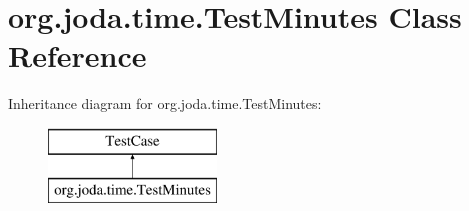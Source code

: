 \hypertarget{classorg_1_1joda_1_1time_1_1_test_minutes}{\section{org.\-joda.\-time.\-Test\-Minutes Class Reference}
\label{classorg_1_1joda_1_1time_1_1_test_minutes}
}
Inheritance diagram for org.\-joda.\-time.\-Test\-Minutes\-:\begin{figure}[H]
\begin{center}
\leavevmode
\includegraphics[height=2.000000cm]{classorg_1_1joda_1_1time_1_1_test_minutes}
\end{center}
\end{figure}
